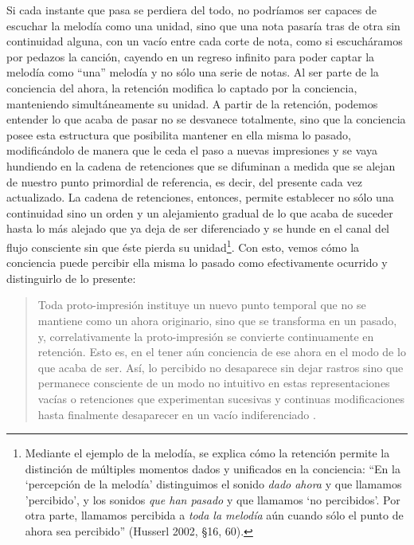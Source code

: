 Si cada instante que pasa se perdiera del todo, no podríamos ser capaces
de escuchar la melodía como una unidad, sino que una nota pasaría tras
de otra sin continuidad alguna, con un vacío entre cada corte de nota,
como si escucháramos por pedazos la canción, cayendo en un regreso
infinito para poder captar la melodía como ``una'' melodía y no sólo una
serie de notas. Al ser parte de la conciencia del ahora, la retención
modifica lo captado por la conciencia, manteniendo simultáneamente su
unidad. A partir de la retención, podemos entender lo que acaba de pasar
no se desvanece totalmente, sino que la conciencia posee esta estructura
que posibilita mantener en ella misma lo pasado, modificándolo de manera
que le ceda el paso a nuevas impresiones y se vaya hundiendo en la
cadena de retenciones que se difuminan a medida que se alejan de nuestro
punto primordial de referencia, es decir, del presente cada vez
actualizado. La cadena de retenciones, entonces, permite establecer no
sólo una continuidad sino un orden y un alejamiento gradual de lo que
acaba de suceder hasta lo más alejado que ya deja de ser diferenciado y
se hunde en el canal del flujo consciente sin que éste pierda su
unidad\footnote{Mediante el ejemplo de la melodía, se explica cómo la
  retención permite la distinción de múltiples momentos dados y
  unificados en la conciencia: ``En la `percepción de la melodía'
  distinguimos el sonido \emph{dado ahora} y que llamamos 'percibido', y
  los sonidos \emph{que han pasado} y que llamamos `no percibidos'. Por
  otra parte, llamamos percibida a \emph{toda la melodía} aún cuando
  sólo el punto de ahora sea percibido'' (Husserl 2002, §16, 60).}. Con
esto, vemos cómo la conciencia puede percibir ella misma lo pasado como
efectivamente ocurrido y distinguirlo de lo presente:

\begin{quote}
Toda proto-impresión instituye un nuevo punto temporal que no se
mantiene como un ahora originario, sino que se transforma en un pasado,
y, correlativamente la proto-impresión se convierte continuamente en
retención. Esto es, en el tener aún conciencia de ese ahora en el modo
de lo que acaba de ser. Así, lo percibido no desaparece sin dejar
rastros sino que permanece consciente de un modo no intuitivo en estas
representaciones vacías o retenciones que experimentan sucesivas y
continuas modificaciones hasta finalmente desaparecer en un vacío
indiferenciado \cite[p.~72]{rizopatron2014}.
\end{quote}


